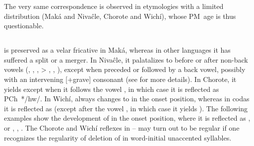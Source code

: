 \begin{exe}
    \ex \stinger \label{s-stinger}
    \ex \son
    \ex \daughter
    \ex \palmg
    \ex \leech
    \ex \wax
    \ex \sandisaj
    \ex \tail
    \ex \dividev
    \ex \lip
    \ex \beard
    \ex \parakeet
    \ex \soul
    \ex \vein
    \ex \spank
    \ex \mesh
    \ex \whitequebracho
    \ex \kingvulture
    \ex \vagina
    \ex \anteater
    \ex \likelove
    \ex \invite
    \ex \eyebrow
    \ex \snake
    \ex \yellowlegs
    \ex \woodpecker
    \ex \blackalgarrobof \label{s-blackalgarrobof}
    \ex \blackalgarrobot \label{s-blackalgarrobot}
    \ex \butterfly
    \ex \stepv
    \ex \good
    \ex \widower
    \ex \meat
\end{exe}

The very same correspondence is observed in etymologies with a limited distribution (Maká and Nivaĉle, Chorote and Wichí), whose PM~age is thus questionable.

\begin{exe}
    \ex \standv
    \ex \leafmn
    \ex \cicada
    \ex \siyaj
    \ex \durmili
    \ex \dovesipup
    \ex \cardon
    \ex \chachalaca
    \ex \skymn
    \ex \cloudmn
    \ex \cardinal
    \ex \temperance
    \ex \aloja
\end{exe}

\subsection{}\label{proto-j}
 is preserved as a velar fricative in Maká, whereas in other languages it has suffered a split or a merger. In Nivaĉle, it palatalizes to  before or after non-back vowels (, , ,  > , , ), except when preceded or followed by a back vowel, possibly with an intervening [+grave] consonant (see  for more details). In Chorote, it yields  except when it follows the vowel , in which case it is reflected as PCh~*/hw/. In Wichí,  always changes to  in the onset position, whereas in codas it is reflected as  (except after the vowel , in which case it yields ). The following examples show the development of  in the onset position, where it is reflected as ,  or , , . The Chorote and Wichí reflexes in -- may turn out to be regular if one recognizes the regularity of deletion of  in word-initial unaccented syllables.

